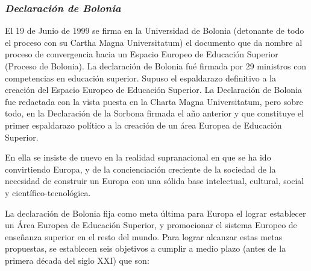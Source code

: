 		\subsubsection{\bfseries \itshape Declaración de Bolonia}
		El 19 de Junio de 1999 se firma en la Universidad de Bolonia (detonante de todo el proceso con su Cartha Magna Universitatum) el documento que da nombre al proceso de convergencia hacia un Espacio Europeo de Educación Superior (Proceso de Bolonia). La declaración de Bolonia \cite{UNIBOL:DB-99} fué firmada por 29 ministros con competencias en educación superior. Supuso el espaldarazo definitivo a la creación del Espacio Europeo de Educación Superior. La Declaración de Bolonia fue redactada con la vista puesta en la Charta Magna Universitatum, pero sobre todo, en la Declaración de la Sorbona firmada el año anterior y que constituye el primer espaldarazo político a la creación de un área Europea de Educación Superior.

		En ella se insiste de nuevo en la realidad supranacional en que se ha ido convirtiendo Europa, y de la concienciación creciente de la sociedad de la necesidad de construir un Europa con una sólida base intelectual, cultural, social y científico-tecnológica. 

		La declaración de Bolonia fija como meta última para Europa el lograr establecer un Área Europea de Educación Superior, y promocionar el sistema Europeo de enseñanza superior en el resto del mundo. Para lograr alcanzar estas metas propuestas, se establecen seis objetivos a cumplir a medio plazo (antes de la primera década del siglo XXI) que son:

